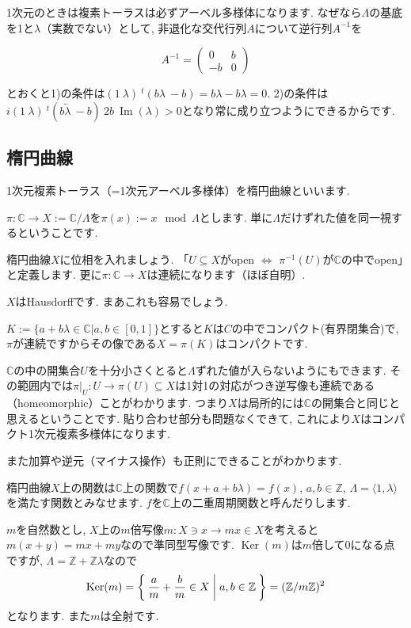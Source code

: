 \documentclass{jsarticle}
\newcommand{\CC}{\mathbb{C}}
\newcommand{\ZZ}{\mathbb{Z}}
\newcommand{\makeop}[1]{\mathop{\mathrm{#1}}\nolimits}
\def\Im{\makeop{Im}}
\def\Ker{\makeop{Ker}}
\theoremstyle{definition}
\numberwithin{theorem}{section}
\begin{document}
1次元のときは複素トーラスは必ずアーベル多様体になります. なぜなら$\Lambda$の基底を1と$\lambda$（実数でない）として, 非退化な交代行列$A$について逆行列$A^{-1}$を

\begin{equation*}
A^{-1} =
\begin{pmatrix}
0 & b \\
-b & 0
\end{pmatrix}
\end{equation*}

とおくと1)の条件は$(1\ \lambda)\ {}^t(b\lambda\ -b) = b\lambda - b\lambda = 0$.
2)の条件は$i(1\ \lambda)\ {}^t(b\tilde\lambda\ -b)\ 2b\ \Im(\lambda) > 0$となり常に成り立つようにできるからです.

\subsection{楕円曲線}
1次元複素トーラス（=1次元アーベル多様体）を楕円曲線といいます.

$\pi: \CC\rightarrow X := \CC/\Lambda$を$\pi(x) := x \mod \Lambda$とします. 単に$\Lambda$だけずれた値を同一視するということです.

楕円曲線$X$に位相を入れましょう. 「$U\subseteq X$がopen $\Leftrightarrow$ $\pi^{-1}(U)$が$\CC$の中でopen」と定義します. 更に$\pi: \CC \rightarrow X$は連続になります（ほぼ自明）.

$X$はHausdorffです. まあこれも容易でしょう.

$K := \{a+b\lambda \in \CC | a, b \in [0, 1]\}$とすると$K$は$C$の中でコンパクト(有界閉集合)で, $\pi$が連続ですからその像である$X = \pi(K)$はコンパクトです.

$\CC$の中の開集合$U$を十分小さくとると$\Lambda$ずれた値が入らないようにもできます. その範囲内では$\pi|_U: U \rightarrow \pi(U) \subseteq X$は1対1の対応がつき逆写像も連続である（homeomorphic）ことがわかります. つまり$X$は局所的には$\CC$の開集合と同じと思えるということです. 貼り合わせ部分も問題なくできて, これにより$X$はコンパクト1次元複素多様体になります.

また加算や逆元（マイナス操作）も正則にできることがわかります.

楕円曲線$X$上の関数は$\CC$上の関数で$f(x+a+b\lambda) = f(x)$, $a, b \in\ZZ$, $\Lambda = \langle1, \lambda\rangle$を満たす関数とみなせます. $f$を$\CC$上の二重周期関数と呼んだりします.

$m$を自然数とし, $X$上の$m$倍写像$m: X \ni x \rightarrow mx \in X$を考えると$m(x+y) = mx+my$なので準同型写像です. $\Ker(m)$は$m$倍して0になる点ですが, $\Lambda = \ZZ + \ZZ\lambda$なので
\[
\Ker(m) = \Set{\frac{a}{m} + \frac{b}{m}\in X | a, b \in \ZZ} = (\ZZ/m\ZZ)^2
\]
となります. また$m$は全射です.
\end{document}
